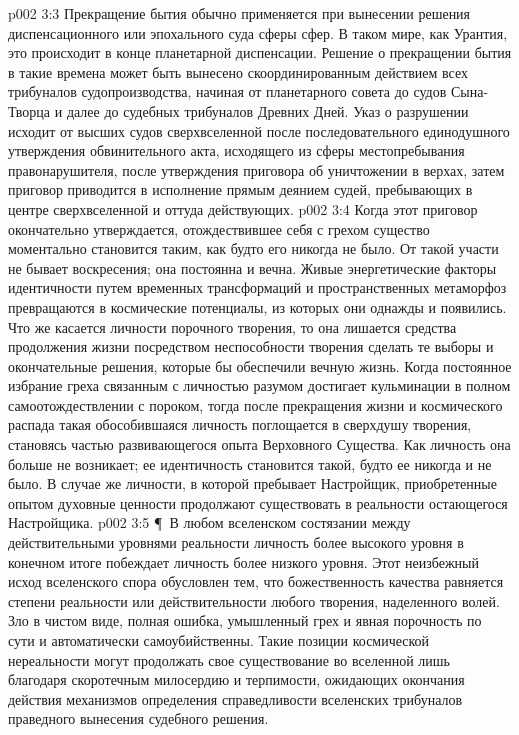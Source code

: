 \vs p002 3:3 Прекращение бытия обычно применяется при вынесении решения диспенсационного или эпохального суда сферы сфер. В таком мире, как Урантия, это происходит в конце планетарной диспенсации. Решение о прекращении бытия в такие времена может быть вынесено скоординированным действием всех трибуналов судопроизводства, начиная от планетарного совета до судов Сына\hyp{}Творца и далее до судебных трибуналов Древних Дней. Указ о разрушении исходит от высших судов сверхвселенной после последовательного единодушного утверждения обвинительного акта, исходящего из сферы местопребывания правонарушителя, после утверждения приговора об уничтожении в верхах, затем приговор приводится в исполнение прямым деянием судей, пребывающих в центре сверхвселенной и оттуда действующих.
\vs p002 3:4 Когда этот приговор окончательно утверждается, отождествившее себя с грехом существо моментально становится таким, как будто его никогда не было. От такой участи не бывает воскресения; она постоянна и вечна. Живые энергетические факторы идентичности путем временных трансформаций и пространственных метаморфоз превращаются в космические потенциалы, из которых они однажды и появились. Что же касается личности порочного творения, то она лишается средства продолжения жизни посредством неспособности творения сделать те выборы и окончательные решения, которые бы обеспечили вечную жизнь. Когда постоянное избрание греха связанным с личностью разумом достигает кульминации в полном самоотождествлении с пороком, тогда после прекращения жизни и космического распада такая обособившаяся личность поглощается в сверхдушу творения, становясь частью развивающегося опыта Верховного Существа. Как личность она больше не возникает; ее идентичность становится такой, будто ее никогда и не было. В случае же личности, в которой пребывает Настройщик, приобретенные опытом духовные ценности продолжают существовать в реальности остающегося Настройщика.
\vs p002 3:5 \P\ В любом вселенском состязании между действительными уровнями реальности личность более высокого уровня в конечном итоге побеждает личность более низкого уровня. Этот неизбежный исход вселенского спора обусловлен тем, что божественность качества равняется степени реальности или действительности любого творения, наделенного волей. Зло в чистом виде, полная ошибка, умышленный грех и явная порочность по сути и автоматически самоубийственны. Такие позиции космической нереальности могут продолжать свое существование во вселенной лишь благодаря скоротечным милосердию и терпимости, ожидающих окончания действия механизмов определения справедливости вселенских трибуналов праведного вынесения судебного решения.
